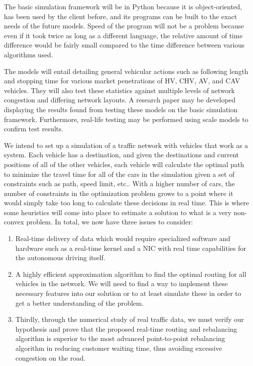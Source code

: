 \documentclass[onecolumn, draftclsnofoot,10pt, compsoc]{IEEEtran}
\begin{document}
The basic simulation framework will be in Python because it is object-oriented, has been used by the client before, and its programs can be built to the exact needs of the future models.
Speed of the program will not be a problem because even if it took twice as long as a different language, the relative amount of time difference would be fairly small compared to the time difference between various algorithms used.

The models will entail detailing general vehicular actions such as following length and stopping time for various market penetrations of HV, CHV, AV, and CAV vehicles.
They will also test these statistics against multiple levels of network congestion and differing network layouts.
A research paper may be developed displaying the results found from testing these models on the basic simulation framework.
Furthermore, real-life testing may be performed using scale models to confirm test results.

We intend to set up a simulation of a traffic network with vehicles that work as a system.
Each vehicle has a destination, and given the destinations and current positions of all of the other vehicles, each vehicle will calculate the optimal path to minimize the travel time for all of the cars in the simulation given a set of constraints such as path, speed limit, etc..
With a higher number of cars, the number of constraints in the optimization problem grows to a point where it would simply take too long to calculate these decisions in real time.
This is where some heuristics will come into place to estimate a solution to what is a very non-convex problem.
In total, we now have three issues to consider:
\begin{enumerate}
\item Real-time delivery of data which would require specialized software and hardware such as a real-time kernel and a NIC with real time capabilities for the autonomous driving itself.
\item A highly efficient approximation algorithm to find the optimal routing for all vehicles in the network.
We will need to find a way to implement these necessary features into our solution or to at least simulate these in order to get a better understanding of the problem.
\item Thirdly, through the numerical study of real traffic data, we must verify our hypothesis and prove that the proposed real-time routing and rebalancing algorithm is superior to the most advanced point-to-point rebalancing algorithm in reducing customer waiting time, thus avoiding excessive congestion on the road.
\end{enumerate}
\end{document}
